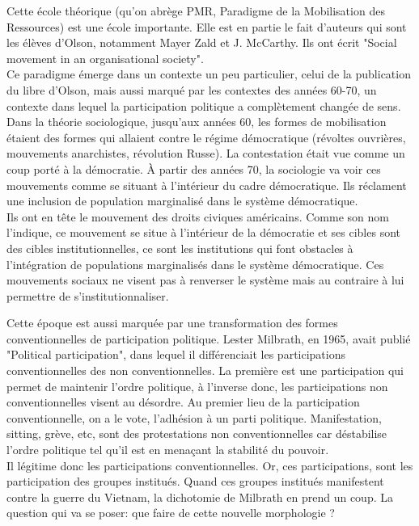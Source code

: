 \documentclass[10pt, a4paper, openany]{book}
\begin{document}
Cette école théorique (qu'on abrège PMR, Paradigme de la Mobilisation des Ressources) est une école importante. Elle est en partie le fait d'auteurs qui sont les élèves d'Olson, notamment Mayer Zald et J. McCarthy. Ils ont écrit "Social movement in an organisational society". \\
Ce paradigme émerge dans un contexte un peu particulier, celui de la publication du libre d'Olson, mais aussi marqué par les contextes des années 60-70, un contexte dans lequel la participation politique a complètement changée de sens. Dans la théorie sociologique, jusqu'aux années 60, les formes de mobilisation étaient des formes qui allaient contre le régime démocratique (révoltes ouvrières, mouvements anarchistes, révolution Russe). La contestation était vue comme un coup porté à la démocratie. À partir des années 70, la sociologie va voir ces mouvements comme se situant à l'intérieur du cadre démocratique. Ils réclament une inclusion de population marginalisé dans le système démocratique. \\
Ils ont en tête le mouvement des droits civiques américains. Comme son nom l'indique, ce mouvement se situe à l'intérieur de la démocratie et ses cibles sont des cibles institutionnelles, ce sont les institutions qui font obstacles à l'intégration de populations marginalisés dans le système démocratique. Ces mouvements sociaux ne visent pas à renverser le système mais au contraire à lui permettre de s'institutionnaliser.


Cette époque est aussi marquée par une transformation des formes conventionnelles de participation politique. Lester Milbrath, en 1965, avait publié "Political participation", dans lequel il différenciait les participations conventionnelles des non conventionnelles. La première est une participation qui permet de maintenir l'ordre politique, à l'inverse donc, les participations non conventionnelles visent au désordre. Au premier lieu de la participation conventionnelle, on a le vote, l'adhésion à un parti politique. Manifestation, sitting, grève, etc, sont des protestations non conventionnelles car déstabilise l'ordre politique tel qu'il est en menaçant la stabilité du pouvoir. \\
Il légitime donc les participations conventionnelles. Or, ces participations, sont les participation des groupes institués. Quand ces groupes institués manifestent contre la guerre du Vietnam, la dichotomie de Milbrath en prend un coup. La question qui va se poser: que faire de cette nouvelle morphologie ?
\end{document}
